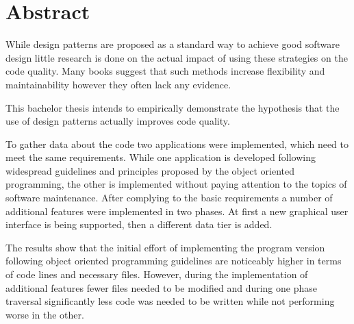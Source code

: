 \chapter{Abstract}

While design patterns are proposed as a standard way to achieve good software design little research is done on the actual impact of using these strategies on the code quality. Many books suggest that such methods increase flexibility and maintainability however they often lack any evidence. 

This bachelor thesis intends to empirically demonstrate the hypothesis that the use of design patterns actually improves code quality. 

To gather data about the code two applications were implemented, which need to meet the same requirements. While one application is developed following widespread guidelines and principles proposed by the object oriented programming, the other is implemented without paying attention to the topics of software maintenance. After complying to the basic requirements a number of additional features were implemented in two phases. At first a new graphical user interface is being supported, then a different data tier is added.

The results show that the initial effort of implementing the program version following object oriented programming guidelines are noticeably higher in terms of code lines and necessary files. However, during the implementation of additional features fewer files needed to be modified and during one phase traversal significantly less code was needed to be written while not performing worse in the other. 

